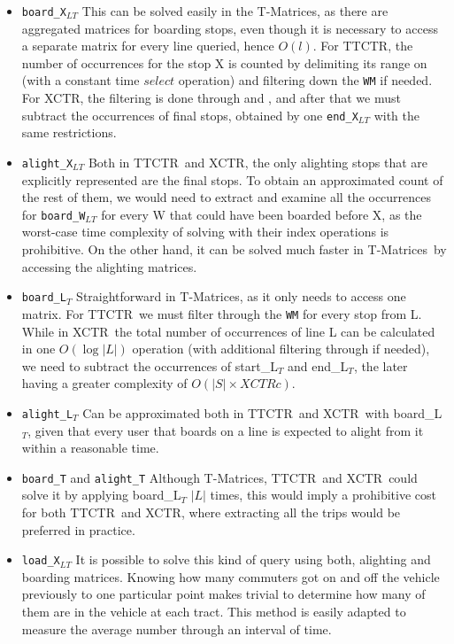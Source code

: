 \documentclass[runningheads]{llncs}
\newcommand{\acumm}{T-Matrices} %
\newcommand{\ctr}{XCTR}
\newcommand{\ttctr}{TTCTR}
\newcommand{\ctrq}{XCTRc}
\begin{document}
\begin{itemize}
    \item \texttt{board\_X$_{LT}$} This can be solved easily in the \acumm, as there are aggregated matrices for boarding stops, even though it is necessary to access a separate matrix for every line queried, hence $O(l)$. For \ttctr, the number of occurrences for the stop X is counted by delimiting its range on  (with a constant time $select$ operation) and filtering down the \texttt{WM} if needed. For \ctr, the filtering is done through  and , and after that we must subtract the occurrences of final stops, obtained by one \texttt{end\_X$_{LT}$} with the same restrictions.
    \item \texttt{alight\_X$_{LT}$} Both in \ttctr~and \ctr, the only alighting stops that are explicitly represented are the final stops. To obtain an approximated count of the rest of them, we would need to extract and examine all the occurrences for \texttt{board\_W$_{LT}$} for every W that could have been boarded before X, as the worst-case time complexity of solving with their index operations is prohibitive. On the other hand, it can be solved much faster in \acumm~by accessing the alighting matrices.
    \item \texttt{board\_L$_T$} Straightforward in \acumm, as it only needs to access one matrix. For \ttctr~we must filter through the \texttt{WM} for every stop from L. While in \ctr~the total number of occurrences of line L can be calculated in one $O(\log|L|)$ operation (with additional filtering through  if needed), we need to subtract the occurrences of start\_L$_T$ and end\_L$_T$, the later having a greater complexity of $O(|S| \times \ctrq)$.
    \item \texttt{alight\_L$_T$} Can be approximated both in \ttctr~and \ctr~with board\_L$_T$, given that every user that boards on a line is expected to alight from it within a reasonable time.
    \item \texttt{board\_T} and \texttt{alight\_T} Although \acumm, \ttctr~and \ctr~could solve it by applying board\_L$_T$ $|L|$ times, this would imply a prohibitive cost for both \ttctr~and \ctr, where extracting all the trips would be preferred in practice.
    \item \texttt{load\_X$_{LT}$} It is possible to solve this kind of query using both, alighting and boarding matrices. Knowing how many commuters got on and off the vehicle previously to one particular point makes trivial to determine how many of them are in the vehicle at each tract. This method is easily adapted to measure the average number through an interval of time.

\end{itemize}
\end{document}
